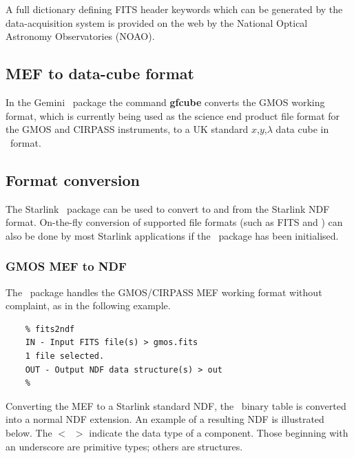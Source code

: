 \documentclass[twoside,11pt]{article}
\newcommand{\htmladdnormallink}[2]{#1}
\newcommand{\xref}[3]{#1}
\newcommand{\xlabel}[1]{}
\begin{document}
A full
\htmladdnormallink{dictionary}{http://iraf.noao.edu/projects/ccdmosaic/imagedef/fitsdic.html}
defining FITS header keywords which can be generated by the
data-acquisition system is provided on the web by the National Optical
Astronomy Observatories (NOAO).
 
\subsection{\xlabel{sc16_mef2cub}MEF to data-cube format\label{sc16_mef2cub}}

In the Gemini \IRAF\ package the command {\bf gfcube} converts the
GMOS working format, which is currently being used as the science end
product file format for the GMOS and CIRPASS instruments, to a UK
standard $x$,$y$,$\lambda$ data cube in \FITSref\ format.

\subsection{\xlabel{sc16_converting}Format conversion\label{sc16_converting}}

The Starlink \CONVERTref\ package  can be used
to convert to and from the Starlink \xref{NDF}{sun33}{} format.
On-the-fly conversion of supported file formats (such as FITS and
\IRAF) can also be done by most Starlink applications if the \CONVERT\
package has been initialised.

\subsubsection{GMOS MEF to NDF}

The \CONVERTref\ package handles the GMOS/CIRPASS MEF
working format without complaint, as in the following example.

\begin{verbatim}
    % fits2ndf
    IN - Input FITS file(s) > gmos.fits
    1 file selected.
    OUT - Output NDF data structure(s) > out
    %
\end{verbatim}

Converting the MEF to a Starlink standard \xref{NDF}{sun33}{}, the
\FITSref\ binary table is converted into a normal NDF extension.  An
example of a resulting NDF is illustrated below.  The $<$~$>$ indicate
the data type of a component.  Those beginning with an underscore are
primitive types; others are structures.
\end{document}
